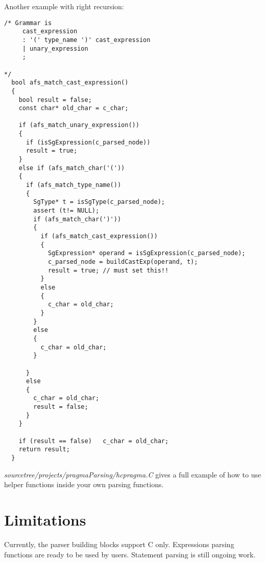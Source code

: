 Another example with right recursion:
\begin{verbatim}
/* Grammar is
     cast_expression
     : '(' type_name ')' cast_expression
     | unary_expression
     ;

*/
  bool afs_match_cast_expression()
  {
    bool result = false;
    const char* old_char = c_char;

    if (afs_match_unary_expression())
    {
      if (isSgExpression(c_parsed_node))
      result = true;
    }
    else if (afs_match_char('('))
    {
      if (afs_match_type_name())
      {
        SgType* t = isSgType(c_parsed_node);
        assert (t!= NULL);
        if (afs_match_char(')'))
        {
          if (afs_match_cast_expression())
          {
            SgExpression* operand = isSgExpression(c_parsed_node);
            c_parsed_node = buildCastExp(operand, t);
            result = true; // must set this!!
          }
          else
          {
            c_char = old_char;
          }
        }
        else
        {
          c_char = old_char;
        }

      }
      else
      {
        c_char = old_char;
        result = false;
      }
    }

    if (result == false)   c_char = old_char;
    return result;
  }

\end{verbatim}



\textit{sourcetree/projects/pragmaParsing/hcpragma.C} gives a full example of how to use helper functions inside your own parsing functions.

\section{Limitations}
Currently, the parser building blocks support C only. Expressions parsing functions are ready to be used by users. 
Statement parsing is still ongoing work. 



